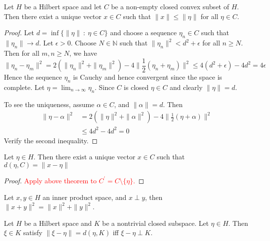 
\chapter{}

\begin{theorem}
  Let $H$ be a Hilbert space and let $C$ be a non-empty closed convex
  subset of $H$. Then there exist a unique vector $x \in C$ such that
  $\|x\| \le \|\eta\|$ for all $\eta \in C$.
\end{theorem}
\begin{proof}
  Let $d = \inf \{ \|\eta\|  \ : \ \eta \in C  \}$ and choose a
  sequence $ \eta_n \in C$  such that $\|\eta_n\| \to d$. Let $
  \epsilon > 0$. Choose $N \in \mathbb{N}$ such that $\|\eta_n\|^2 <
  d^2 + \epsilon$ for all $n \ge N$. Then for all $m,n \ge N$, we have \[
    \|\eta_n - \eta_m\|^2 = 2(\|\eta_n\|^2 + \|\eta_m\|^2) - 4 \|
    \frac{1}{2}(\eta_n + \eta_m) \|^2 \le 4(d^2  + \epsilon) - 4d^2 = 4 \epsilon
  \]
  Hence the sequence $\eta_n$ is Cauchy and hence convergent since
  the space is complete. Let $\eta = \lim_{n \to \infty} \eta_n$.
  Since $C$ is closed $\eta \in C$ and clearly $\|\eta\| = d$.

  To see the uniqueness, assume $\alpha \in C$, and $\| \alpha\| = d$. Then
  \begin{align*}
    \|\eta - \alpha\|^2 &= 2(\|\eta\|^2 + \|\alpha\|^2) - 4 \|
    \frac{1}{2}(\eta + \alpha) \|^2 \\
    & \le 4d^2 - 4d^2 = 0
  \end{align*}
  Verify the second inequality.
\end{proof}

\begin{corollary}
  Let $\eta \in H$. Then there exist a unique vector $x \in C$ such
  that $d(\eta, C) = \|x - \eta\|$
\end{corollary}
\begin{proof}
  \textcolor{red}{Apply above theorem to $C^\prime = C \setminus \{ \eta \}$.}
\end{proof}

\begin{proposition}
  Let $ x, y \in H$ an inner product space, and $x \perp y$, then
  $\|x + y\|^2 = \|x\|^2 + \|y\|^2$.
\end{proposition}

\begin{lemma}
  \label{lem:15}
  Let $H$ be a Hilbert space and $K$ be a nontrivial closed subspace.
  Let $\eta \in H$. Then $\xi \in K$ satisfy $\|\xi - \eta\| = d(\eta, K)$ iff
  $\xi - \eta \perp K$.
\end{lemma}

